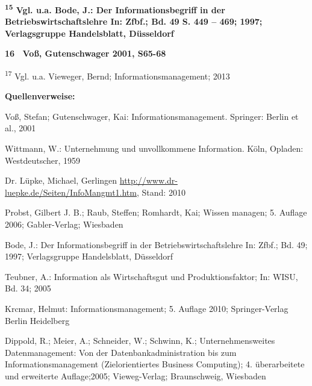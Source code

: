 \documentclass[a4paper]{article}
\begin{document}
\bigskip


\bigskip


\bigskip


\bigskip


\bigskip


\bigskip

{\sffamily\bfseries\color{black}
\textmd{\textsuperscript{15 }}\textrm{\textmd{Vgl. u.a. Bode, J.: Der Informationsbegriff in der
Betriebswirtschaftslehre In: Zfbf.; Bd. 49 S. 449 – 469; 1997; Verlagsgruppe Handelsblatt, Düsseldorf}} }

{\sffamily\bfseries\color{black}
\textmd{16 \ Voß, Gutenschwager 2001, S65-68}}

{\sffamily\color{black}
\textsuperscript{17 }\textrm{Vgl. u.a. Vieweger, Bernd; Informationsmanagement;} 2013}

{\sffamily\bfseries\color{black}
Quellenverweise:}

{\sffamily\color{black}
Voß, Stefan; Gutenschwager, Kai: Informationsmanagement. Springer: Berlin et al., 2001}


\bigskip

{\sffamily\color{black}
Wittmann, W.: Unternehmung und unvollkommene Information. Köln, Opladen: Westdeutscher, 1959}


\bigskip

{\sffamily\color{black}
Dr. Lüpke, Michael, Gerlingen \url{http://www.dr-luepke.de/Seiten/InfoMangmt1.htm}, Stand: 2010}


\bigskip

{\sffamily\color{black}
Probst, Gilbert J. B.; Raub, Steffen; Romhardt, Kai; Wissen managen; 5. Auflage 2006; Gabler-Verlag; Wiesbaden}


\bigskip

{\sffamily\color{black}
Bode, J.: Der Informationsbegriff in der Betriebswirtschaftslehre In: Zfbf.; Bd. 49; 1997; Verlagsgruppe Handelsblatt,
Düsseldorf}


\bigskip

{\sffamily\color{black}
Teubner, A.: Information als Wirtschaftsgut und Produktionsfaktor; In: WISU, Bd. 34; 2005 }


\bigskip

{\sffamily\color{black}
Krcmar, Helmut: Informationsmanagement; 5. Auflage 2010; Springer-Verlag Berlin Heidelberg}


\bigskip

{\sffamily\color{black}
Dippold, R.; Meier, A.; Schneider, W.; Schwinn, K.; Unternehmensweites Datenmanagement: Von der Datenbankadministration
bis zum Informationsmanagement (Zielorientiertes Business Computing); 4. überarbeitete und erweiterte Auflage;2005;
Vieweg-Verlag; Braunschweig, Wiesbaden }
\end{document}
